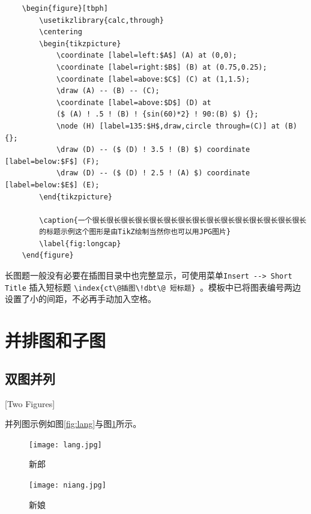 \begin{lstlisting}
    \begin{figure}[tbph]
        \usetikzlibrary{calc,through}
        \centering
        \begin{tikzpicture}
            \coordinate [label=left:$A$] (A) at (0,0);
            \coordinate [label=right:$B$] (B) at (0.75,0.25);
            \coordinate [label=above:$C$] (C) at (1,1.5);
            \draw (A) -- (B) -- (C);
            \coordinate [label=above:$D$] (D) at
            ($ (A) ! .5 ! (B) ! {sin(60)*2} ! 90:(B) $) {};
            \node (H) [label=135:$H$,draw,circle through=(C)] at (B) {};
            \draw (D) -- ($ (D) ! 3.5 ! (B) $) coordinate [label=below:$F$] (F);
            \draw (D) -- ($ (D) ! 2.5 ! (A) $) coordinate [label=below:$E$] (E);
        \end{tikzpicture}

        \caption{一个很长很长很长很长很长很长很长很长很长很长很长很长很长很长很长
        的标题示例这个图形是由TikZ绘制当然你也可以用JPG图片}
        \label{fig:longcap}
    \end{figure}
\end{lstlisting}

长图题一般没有必要在插图目录中也完整显示，可使用菜单\texttt{Insert -{}-\textgreater{} Short
Title} 插入短标题 \verb|\index{ct\@插图\!dbt\@ 短标题} |。模板中已将图表编号两边设置了小的间距，不必再手动加入空格。

\section{并排图和子图}
\subsection{双图并列}[Two Figures]

并列图示例如图\ref{fig:lang}与图\ref{fig:niang}所示。

\begin{figure}[htbp]
  \centering
  \begin{minipage}{0.4\textwidth}
    \centering
    \texttt{[image: lang.jpg]}
    \caption{新郎}
    \label{fig:lang}
  \end{minipage}
  \begin{minipage}{0.4\textwidth}
    \centering
    \texttt{[image: niang.jpg]}
    \caption{新娘}
    \label{fig:niang}
  \end{minipage}
\end{figure}

